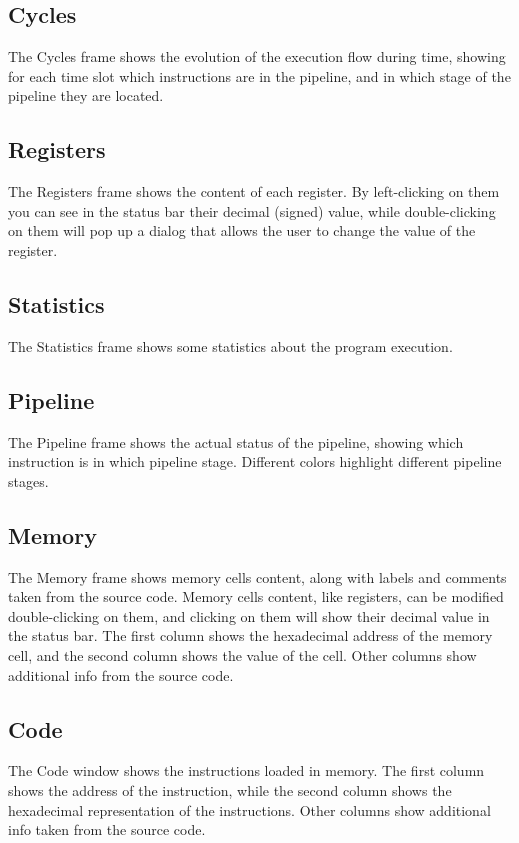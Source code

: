 \documentclass[letterpaper,10pt,english]{sphinxmanual}
\begin{document}
\subsection{Cycles}
\label{user-interface:cycles}
The Cycles frame shows the evolution of the execution flow during time, showing
for each time slot which instructions are in the pipeline, and in which stage of
the pipeline they are located.


\subsection{Registers}
\label{user-interface:registers}
The Registers frame shows the content of each register. By left-clicking on them
you can see in the status bar their decimal (signed) value, while
double-clicking on them will pop up a dialog that allows the user to change the
value of the register.


\subsection{Statistics}
\label{user-interface:statistics}
The Statistics frame shows some statistics about the program execution.


\subsection{Pipeline}
\label{user-interface:pipeline}
The Pipeline frame shows the actual status of the pipeline, showing which
instruction is in which pipeline stage. Different colors highlight different
pipeline stages.


\subsection{Memory}
\label{user-interface:memory}
The Memory frame shows memory cells content, along with labels and comments
taken from the source code. Memory cells content, like registers, can be modified
double-clicking on them, and clicking on them will show their decimal value in
the status bar.
The first column shows the hexadecimal address of the memory cell, and the
second column shows the value of the cell. Other columns show additional info
from the source code.


\subsection{Code}
\label{user-interface:code}
The Code window shows the instructions loaded in memory. The first column shows
the address of the instruction, while the second column shows the hexadecimal
representation of the instructions. Other columns show additional info taken
from the source code.
\end{document}
